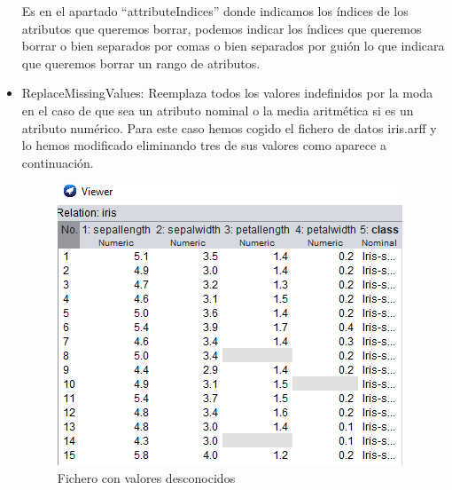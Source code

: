 \begin{itemize}
Es en el apartado ``attributeIndices'' donde indicamos los índices de los atributos que queremos borrar, podemos indicar los índices que queremos borrar o bien separados por comas o bien separados por guión lo que indicara que queremos borrar un rango de atributos.

    \item ReplaceMissingValues:
Reemplaza todos los valores indefinidos por la moda en el caso de que
sea un atributo nominal o la media aritmética si es un atributo numérico.
Para este caso hemos cogido el fichero de datos iris.arff y lo hemos modificado eliminando tres de sus valores como aparece a continuación.
 \begin{figure}[H]
    \centering
    \includegraphics[width=\textwidth, height=1.1\textwidth]{img/BRP.PNG}
    \caption{Fichero con valores desconocidos}
    \label{fig:ReplaceMissingValues}
\end{figure}


\end{itemize}
